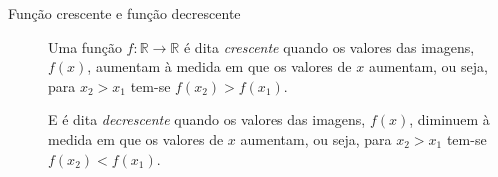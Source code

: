 \begin{description}
\item[{Função crescente e função decrescente}] \leavevmode{}\label{\detokenize{AF106-5:term-funcao-crescente-e-funcao-decrescente}}
Uma função \(f: \mathbb{R} \to \mathbb{R}\) é dita \emph{crescente} quando os valores das imagens, \(f(x)\), aumentam à medida em que os valores de \(x\) aumentam, ou seja, para \(x_2>x_1\) tem-se \(f(x_2)>f(x_1)\).

\begin{figure}[H]
\centering

\end{figure}

E é dita \emph{decrescente} quando os valores das imagens, \(f(x)\), diminuem à medida em que os valores de \(x\) aumentam, ou seja, para \(x_2>x_1\) tem-se \(f(x_2)<f(x_1)\).
\begin{figure}[H]
\centering

\end{figure}

\end{description}


